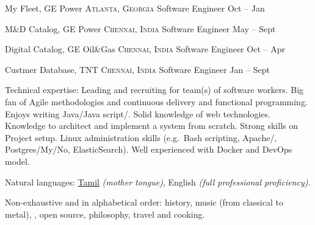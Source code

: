 \documentclass[10pt,a4paper]{article}
\begin{document}
\headedsection
  {\textnormal{My Fleet, GE Power}}
  {\textsc{Atlanta, Georgia}} {
  \headedsubsection
    {Software Engineer}
    {Oct  -- Jan }
    {\bodytext{}}
}

\headedsection
  {\textnormal{M&D Catalog, GE Power}}
  {\textsc{Chennai, India}} {
  \headedsubsection
    {Software Engineer}
    {May  -- Sept }
    {\bodytext{}}
}

\headedsection
  {\textnormal{Digital Catalog, GE Oil&Gas}}
  {\textsc{Chennai, India}} {
  \headedsubsection
    {Software Engineer}
    {Oct  -- Apr }
    {\bodytext{}}
}

\headedsection
  {\textnormal{Custmer Database, TNT}}
  {\textsc{Chennai, India}} {
  \headedsubsection
    {Software Engineer}
    {Jan  -- Sept }
    {\bodytext{}}
}

\spacedhrule{0.5em}{-0.4em}


\inlineheadsection  %
  {Technical expertise:}
  {Leading and recruiting for team(s) of software workers.  Big fan of Agile methodologies and continuous delivery and functional programming.  Enjoys writing Java/\nsp Java script/\nsp.  Solid knowledge of web technologies. Knowledge to architect and implement a system from scratch.  Strong skills on Project setup. Linux administration skills (e.g.\ Bash scripting, Apache/, Postgres/My/No, ElasticSearch).  Well experienced with Docker and DevOps model.}

\vspace{0.5em}
\inlineheadsection
  {Natural languages:}
  {\href{https://en.wikipedia.org/wiki/Tamil_language}{Tamil} \emph{(mother tongue)}, English \emph{(full professional proficiency)}.}

\spacedhrule{1.6em}{-0.4em}


\inlineheadsection
  {Non-exhaustive and in alphabetical order:}
  {history, music (from classical to metal), , open source, philosophy, travel and cooking.}
\end{document}
